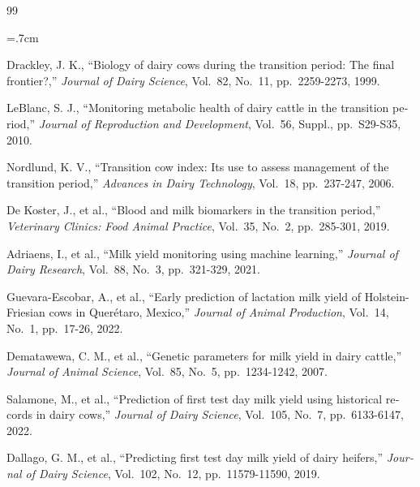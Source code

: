 \renewcommand{\bibname}{مراجع}

\begin{thebibliography}{99}
	
	\begin{latin}
		
		\baselineskip=.7cm
		
	\noindent Drackley, J. K., ``Biology of dairy cows during the transition period: The final frontier?,'' \textit{Journal of Dairy Science}, Vol.~82, No.~11, pp.~2259-2273, 1999.
	
	\noindent LeBlanc, S. J., ``Monitoring metabolic health of dairy cattle in the transition period,'' \textit{Journal of Reproduction and Development}, Vol.~56, Suppl., pp.~S29-S35, 2010.
	
	\noindent Nordlund, K. V., ``Transition cow index: Its use to assess management of the transition period,'' \textit{Advances in Dairy Technology}, Vol.~18, pp.~237-247, 2006.
	
	\noindent De Koster, J., et al., ``Blood and milk biomarkers in the transition period,'' \textit{Veterinary Clinics: Food Animal Practice}, Vol.~35, No.~2, pp.~285-301, 2019.
	
	\noindent Adriaens, I., et al., ``Milk yield monitoring using machine learning,'' \textit{Journal of Dairy Research}, Vol.~88, No.~3, pp.~321-329, 2021.
	
	\noindent Guevara-Escobar, A., et al., ``Early prediction of lactation milk yield of Holstein-Friesian cows in Querétaro, Mexico,'' \textit{Journal of Animal Production}, Vol.~14, No.~1, pp.~17-26, 2022.
	
	\noindent Dematawewa, C. M., et al., ``Genetic parameters for milk yield in dairy cattle,'' \textit{Journal of Animal Science}, Vol.~85, No.~5, pp.~1234-1242, 2007.
	
	\noindent Salamone, M., et al., ``Prediction of first test day milk yield using historical records in dairy cows,'' \textit{Journal of Dairy Science}, Vol.~105, No.~7, pp.~6133-6147, 2022.
	
	\noindent Dallago, G. M., et al., ``Predicting first test day milk yield of dairy heifers,'' \textit{Journal of Dairy Science}, Vol.~102, No.~12, pp.~11579-11590, 2019.
	

\end{latin}
\end{thebibliography}
